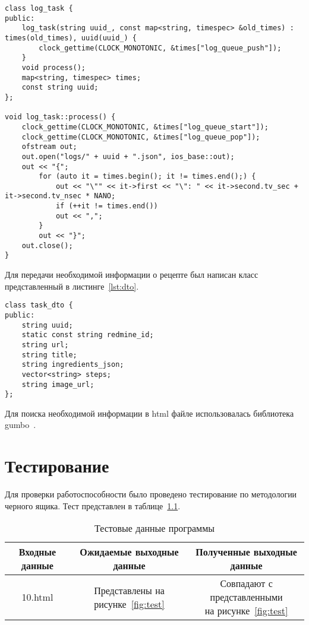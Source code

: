 \clearpage
\begin{lstlisting}[caption={Класс задачи на этапе логирования значений времен}, label=lst:log]
class log_task {
public:
	log_task(string uuid_, const map<string, timespec> &old_times) : times(old_times), uuid(uuid_) {
		clock_gettime(CLOCK_MONOTONIC, &times["log_queue_push"]);
	}
	void process();
	map<string, timespec> times;
	const string uuid;
};

void log_task::process() {
	clock_gettime(CLOCK_MONOTONIC, &times["log_queue_start"]);
	clock_gettime(CLOCK_MONOTONIC, &times["log_queue_pop"]);
	ofstream out;
	out.open("logs/" + uuid + ".json", ios_base::out);
	out << "{";
		for (auto it = times.begin(); it != times.end();) {
			out << "\"" << it->first << "\": " << it->second.tv_sec + it->second.tv_nsec * NANO;
			if (++it != times.end())
			out << ",";
		}
		out << "}";
	out.close();
}
\end{lstlisting}

Для передачи необходимой информации о рецепте был написан класс представленный в листинге~\ref{lst:dto}.

\begin{lstlisting}[caption={Класс для передачи данных о рецепте}, label=lst:dto]
class task_dto {
public:
	string uuid;
	static const string redmine_id;
	string url;
	string title;
	string ingredients_json;
	vector<string> steps;
	string image_url;
};
\end{lstlisting}

Для поиска необходимой информации в html файле использовалась библиотека gumbo~\cite{gumbo}.

\chapter{Тестирование}

Для проверки работоспособности было проведено тестирование по методологии черного ящика. Тест представлен в таблице~\ref{tab:test}.

\begin{table}[H]
	\caption{Тестовые данные программы}
	\label{tab:test}
	\centering
	\begin{tabular}{|c|c|c|}
		\hline
		Входные данные & Ожидаемые выходные данные & Полученные выходные данные\\\hline
		10.html & Представлены на рисунке~\ref{fig:test} & \shortstack{Совпадают с представленными\\на рисунке~\ref{fig:test}}\\\hline
	\end{tabular}
\end{table}

